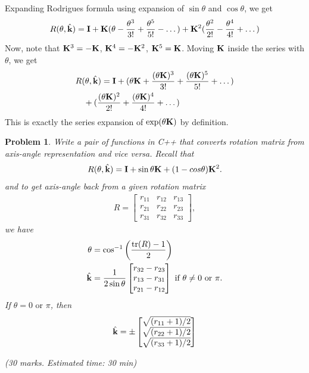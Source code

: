 \documentclass{article}
\newtheorem{prob}{Problem}
\begin{document}
Expanding Rodrigues formula using expansion of $\sin\theta$ and $\cos\theta$, we
get
\begin{align}
  R(\theta, \hat{\mathbf{k}}) = \mathbf{I} + \mathbf{K}(\theta - \frac{\theta^3}{3!} + \frac{\theta^5}{5!}  - \dots) + \mathbf{K}^2(\frac{\theta^2 }{2!} - \frac{\theta^4}{4!} + \dots )
\end{align}
Now, note that $\mathbf{K}^3 = -\mathbf{K}$, $\mathbf{K}^4 = -\mathbf{K}^2$, $\mathbf{K}^5 = \mathbf{K}$. Moving
$\mathbf{K}$ inside the series with $\theta$, we get
\begin{align}
  &R(\theta, \hat{\mathbf{k}}) = \mathbf{I} + (\theta\mathbf{K} + \frac{(\theta\mathbf{K})^3}{3!} + \frac{(\theta\mathbf{K})^5}{5!}  + \dots)
    \notag\\
  &\quad
  + (\frac{(\theta\mathbf{K})^2 }{2!} + \frac{(\theta\mathbf{K})^4}{4!} + \dots )
  \end{align}
  This is exactly the series expansion of $\exp(\theta\mathbf{K})$ by definition.
\fi

\begin{prob}
  Write a pair of functions in C++ that converts rotation matrix from axis-angle
  representation and vice versa. Recall that
  \begin{align}
    R(\theta, \hat{\mathbf{k}}) = \mathbf{I} + \sin \theta \mathbf{K} + (1-cos \theta) \mathbf{K}^2.
  \end{align}
  and to get axis-angle back from a given rotation matrix
  \begin{align}
    R = \begin{bmatrix}
      r_{11} & r_{12} & r_{13} \\
      r_{21} & r_{22} & r_{23} \\
      r_{31} & r_{32} & r_{33}
      \end{bmatrix},
  \end{align}
  we have
  \begin{align}
    \theta &= \cos^{-1} \left(\frac{\text{tr}(R) - 1}{2}\right)
    \\
    \hat{\mathbf{k}} &= \frac{1}{2\sin\theta}\begin{bmatrix}
      r_{32} - r_{23} \\
      r_{13} - r_{31} \\
      r_{21} - r_{12}
      \end{bmatrix} \text{ if  } \theta \ne 0 \text{ or } \pi.
  \end{align}
 If $\theta = 0 \text{ or } \pi$, then
 \begin{align}
   \hat{\mathbf{k}} = \pm\begin{bmatrix}
    \sqrt{(r_{11} + 1)/2}\\
    \sqrt{(r_{22} + 1)/2}\\
    \sqrt{(r_{33} + 1)/2}
   \end{bmatrix}
   \end{align}
  
  (30 marks. Estimated time: 30 min)
  \label{prob:euler-to-rotmat}
\end{prob}
\end{document}
